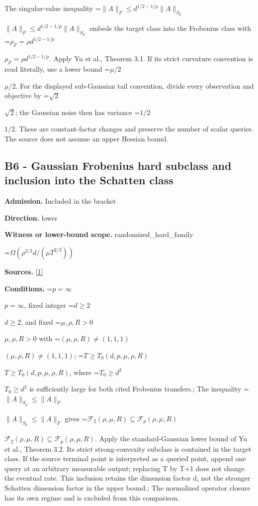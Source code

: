 \documentclass[10pt,a4paper]{article}
\newcommand{\AtlasMath}[1]{\par\begingroup\centering\setbox0=\hbox{$\displaystyle #1$}\ifdim\wd0>1.4\linewidth\typeout{ATLAS WIDE FORMULA: \the\wd0}\fi\ifdim\wd0>\linewidth\resizebox{\linewidth}{!}{\box0}\else\box0\fi\par\endgroup}
\newcommand{\AtlasInlineMath}[1]{\begingroup\setbox0=\hbox{$#1$}\ifdim\wd0>.4\linewidth\endgroup\AtlasMath{#1}\else\endgroup$#1$\fi}
\begin{document}
The singular-value inequality \AtlasInlineMath{\|A\|_F\le d^{1/2-1/p}\|A\|_{S_p}} embeds the target class into the Frobenius class with \AtlasInlineMath{\rho_F=\rho d^{1/2-1/p}}. Apply Yu et al., Theorem 3.1. If its strict curvature convention is read literally, use a lower bound \AtlasInlineMath{\mu/2}. For the displayed sub-Gaussian tail convention, divide every observation and objective by \AtlasInlineMath{\sqrt2}; the Gaussian noise then has variance \AtlasInlineMath{1/2}. These are constant-factor changes and preserve the number of scalar queries. The source does not assume an upper Hessian bound.



\subsection{B6 - Gaussian Frobenius hard subclass and inclusion into the Schatten class}


\textbf{Admission.} Included in the bracket



\textbf{Direction.} lower



\textbf{Witness or lower-bound scope.} randomized\_hard\_family



\AtlasMath{\Omega(\rho^{2/3}d/(\mu T^{2/3}))}


\textbf{Sources.} \href{https://papers.nips.cc/paper_files/paper/2024/file/b444ad72520a5f5c467343be88e352ed-Paper-Conference.pdf}{[1]}



\textbf{Conditions.} \AtlasInlineMath{p=\infty}, fixed integer \AtlasInlineMath{d\ge2}, and fixed \AtlasInlineMath{\mu,\rho,R>0} with \AtlasInlineMath{(\mu,\rho,R)\ne(1,1,1)}; \AtlasInlineMath{T\ge T_0(d,p,\mu,\rho,R)}, where \AtlasInlineMath{T_0\ge d^2} is sufficiently large for both cited Frobenius transfers.; The inequality \AtlasInlineMath{\|A\|_{S_p}\le\|A\|_F} gives \AtlasInlineMath{\mathcal F_2(\rho,\mu,R)\subseteq\mathcal F_p(\rho,\mu,R)}. Apply the standard-Gaussian lower bound of Yu et al., Theorem 3.2. Its strict strong-convexity subclass is contained in the target class. If the source terminal point is interpreted as a queried point, append one query at an arbitrary measurable output; replacing T by T+1 does not change the eventual rate. This inclusion retains the dimension factor d, not the stronger Schatten dimension factor in the upper bound.; The normalized operator closure has its own regime and is excluded from this comparison.
\end{document}
